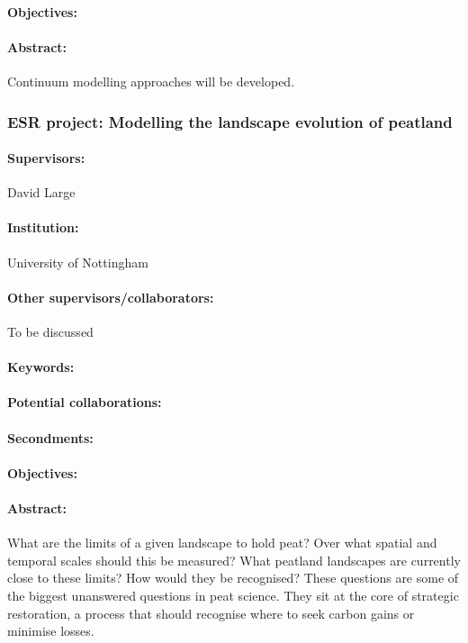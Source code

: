 \documentclass[12pt]{article}
\begin{document}
\paragraph{Objectives:} 
\paragraph{Abstract:} Continuum modelling approaches will be developed.

\subsubsection*{ESR project: Modelling the landscape evolution of peatland}
\paragraph{Supervisors:} David Large
\paragraph{Institution:} University of Nottingham
\paragraph{Other supervisors/collaborators:} To be discussed
\paragraph{Keywords:} 
\paragraph{Potential collaborations:} 
\paragraph{Secondments:} 
\paragraph{Objectives:} 
\paragraph{Abstract:} What are the limits of a given landscape to hold peat? Over what spatial and temporal scales should this be measured?  What peatland landscapes are currently close to these limits? How would they be recognised? 
These questions are some of the biggest unanswered questions in peat science. They sit at the core of strategic restoration, a process that should recognise where to seek carbon gains or minimise losses.  
\end{document}
